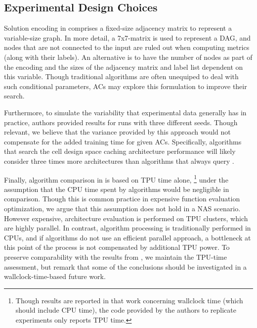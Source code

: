 \subsection{Experimental Design Choices}
Solution encoding in \nasbench comprises a fixed-size adjacency matrix to represent a variable-size graph. In more detail, a 7x7-matrix is used to represent a DAG, and nodes that are not connected to the input are ruled out when computing metrics (along with their labels). An alternative is to have the number of nodes as part of the encoding and the sizes of the adjacency matrix and label list dependent on this variable. Though traditional algorithms are often unequiped to deal with such conditional parameters, ACs may explore this formulation to improve their search.

Furthermore, to simulate the variability that experimental data generally has in practice, authors provided results for runs with three different seeds. Though relevant, we believe that the variance provided by this approach would not compensate for the added training time for given ACs. Specifically, algorithms that search the cell design space caching architecture performance will likely consider three times more architectures than algorithms that always query \nasbench. %

Finally, algorithm comparison in \nasbench is based on TPU time alone,%
\footnote{Though results are reported in that work concerning wallclock time (which should include CPU time), the code provided by the authors to replicate experiments only reports TPU time.}
under the assumption that the CPU time spent by algorithms would be negligible in comparison. Though this is common practice in expensive function evaluation optimization, we argue that this assumption does not hold in a NAS scenario. However expensive, architecture evaluation is performed on TPU clusters, which are highly parallel. In contrast, algorithm processing is traditionally performed in CPUs, and if algorithms do not use an efficient parallel approach, a bottleneck at this point of the process is not compensated by additional TPU power. To preserve comparability with the results from \nasbench, we maintain the TPU-time assessment, but remark that some of the conclusions should be investigated in a wallclock-time-based future work.

